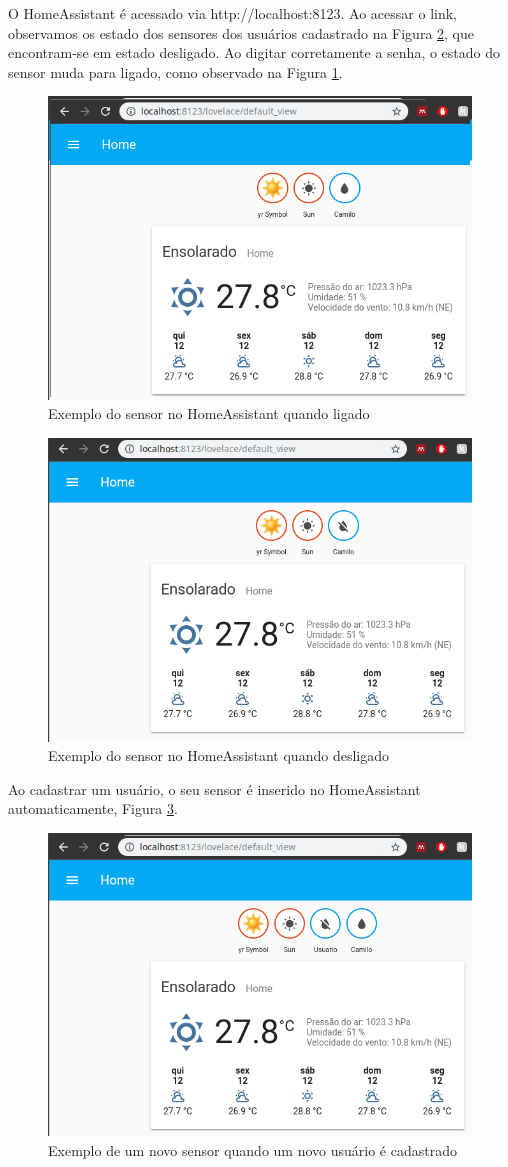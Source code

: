 O HomeAssistant é acessado via http://localhost:8123. Ao acessar o link, observamos os estado dos sensores dos usuários cadastrado na Figura \ref{fig:homeassistant-off}, que encontram-se em estado desligado. Ao digitar corretamente a senha, o estado do sensor muda para ligado, como observado na Figura \ref{fig:homeassistant-on}.

\begin{figure}[htbp]
	\centering
	\includegraphics[width=0.6\linewidth]{figuras/homeassistanton.png}
	\caption{Exemplo do sensor no HomeAssistant quando ligado}
	\label{fig:homeassistant-on}
\end{figure}

\begin{figure}[htbp]
	\centering
	\includegraphics[width=0.6\linewidth]{figuras/homeassistantoff.png}
	\caption{Exemplo do sensor no HomeAssistant quando desligado}
	\label{fig:homeassistant-off}
\end{figure}

Ao cadastrar um usuário, o seu sensor é inserido no HomeAssistant automaticamente, Figura \ref{fig:homeassistant-new}.

\begin{figure}[htbp]
	\centering
	\includegraphics[width=1\linewidth]{figuras/homeassistantnewuser.png}
	\caption{Exemplo de um novo sensor quando um novo usuário é cadastrado}
	\label{fig:homeassistant-new}
\end{figure}


